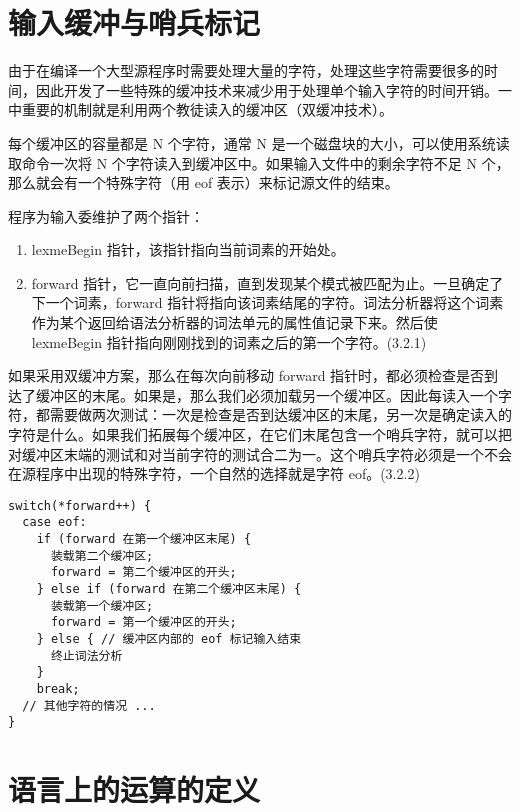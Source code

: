 \documentclass[12pt]{article}
\begin{document}
\section*{输入缓冲与哨兵标记}

由于在编译一个大型源程序时需要处理大量的字符，处理这些字符需要很多的时间，因此开发了一些特殊的缓冲技术来减少用于处理单个输入字符的时间开销。一中重要的机制就是利用两个教徒读入的缓冲区（双缓冲技术）。

每个缓冲区的容量都是 N 个字符，通常 N 是一个磁盘块的大小，可以使用系统读取命令一次将 N 个字符读入到缓冲区中。如果输入文件中的剩余字符不足 N 个，那么就会有一个特殊字符（用 eof 表示）来标记源文件的结束。

程序为输入委维护了两个指针：
\begin{enumerate}
\item lexmeBegin 指针，该指针指向当前词素的开始处。
\item forward 指针，它一直向前扫描，直到发现某个模式被匹配为止。一旦确定了下一个词素，forward 指针将指向该词素结尾的字符。词法分析器将这个词素作为某个返回给语法分析器的词法单元的属性值记录下来。然后使 lexmeBegin 指针指向刚刚找到的词素之后的第一个字符。(3.2.1)
\end{enumerate}

如果采用双缓冲方案，那么在每次向前移动 forward 指针时，都必须检查是否到达了缓冲区的末尾。如果是，那么我们必须加载另一个缓冲区。因此每读入一个字符，都需要做两次测试：一次是检查是否到达缓冲区的末尾，另一次是确定读入的字符是什么。如果我们拓展每个缓冲区，在它们末尾包含一个哨兵字符，就可以把对缓冲区末端的测试和对当前字符的测试合二为一。这个哨兵字符必须是一个不会在源程序中出现的特殊字符，一个自然的选择就是字符 eof。(3.2.2)

\pagebreak
\begin{lstlisting}[caption={带有哨兵标记的 forward 指针移动算法}
]
switch(*forward++) {
  case eof:
    if (forward 在第一个缓冲区末尾) {
	  装载第二个缓冲区;
	  forward = 第二个缓冲区的开头;
	} else if (forward 在第二个缓冲区末尾) {
	  装载第一个缓冲区;
	  forward = 第一个缓冲区的开头;
	} else { // 缓冲区内部的 eof 标记输入结束
	  终止词法分析
	}
	break;
  // 其他字符的情况 ...
}
\end{lstlisting}






\section*{语言上的运算的定义}
\end{document}
